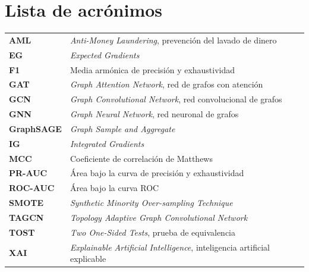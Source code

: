 \chapter*{Lista de acrónimos}
\begin{longtable}{p{}p{}}
\textbf{AML} & \textit{Anti-Money Laundering}, prevención del lavado de dinero \\[2pt]
\textbf{EG} & \textit{Expected Gradients} \\[2pt]
\textbf{F1} & Media armónica de precisión y exhaustividad \\[2pt]
\textbf{GAT} & \textit{Graph Attention Network}, red de grafos con atención \\[2pt]
\textbf{GCN} & \textit{Graph Convolutional Network}, red convolucional de grafos \\[2pt]
\textbf{GNN} & \textit{Graph Neural Network}, red neuronal de grafos \\[2pt]
\textbf{GraphSAGE} & \textit{Graph Sample and Aggregate} \\[2pt]
\textbf{IG} & \textit{Integrated Gradients} \\[2pt]
\textbf{MCC} & Coeficiente de correlación de Matthews \\[2pt]
\textbf{PR-AUC} & Área bajo la curva de precisión y exhaustividad \\[2pt]
\textbf{ROC-AUC} & Área bajo la curva ROC \\[2pt]
\textbf{SMOTE} & \textit{Synthetic Minority Over-sampling Technique} \\[2pt]
\textbf{TAGCN} & \textit{Topology Adaptive Graph Convolutional Network} \\[2pt]
\textbf{TOST} & \textit{Two One-Sided Tests}, prueba de equivalencia \\[2pt]
\textbf{XAI} & \textit{Explainable Artificial Intelligence}, inteligencia artificial explicable \\[2pt]
\end{longtable}
